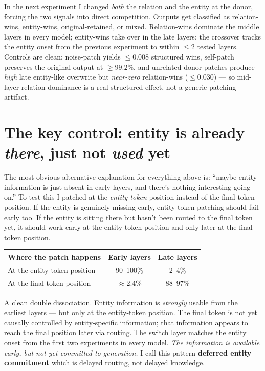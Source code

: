 \documentclass[10pt]{article}
\begin{document}
In the next experiment I changed \emph{both} the relation and the entity at the donor, forcing the two signals into direct competition. Outputs get classified as relation-wins, entity-wins, original-retained, or mixed. Relation-wins dominate the middle layers in every model; entity-wins take over in the late layers; the crossover tracks the entity onset from the previous experiment to within $\leq 2$ tested layers. Controls are clean: noise-patch yields $\leq 0.008$ structured wins, self-patch preserves the original output at $\geq 99.2\%$, and unrelated-donor patches produce \emph{high} late entity-like overwrite but \emph{near-zero} relation-wins ($\leq 0.030$) --- so mid-layer relation dominance is a real structured effect, not a generic patching artifact.

\section*{The key control: entity is already \emph{there}, just not \emph{used} yet}

The most obvious alternative explanation for everything above is: ``maybe entity information is just absent in early layers, and there's nothing interesting going on.'' To test this I patched at the \emph{entity-token} position instead of the final-token position. If the entity is genuinely missing early, entity-token patching should fail early too. If the entity is sitting there but hasn't been routed to the final token yet, it should work early at the entity-token position and only later at the final-token position.

\begin{center}\small
\begin{tabular}{lcc}
\toprule
Where the patch happens & Early layers & Late layers \\
\midrule
At the entity-token position & 90--100\% & 2--4\% \\
At the final-token position  & $\approx$2.4\% & 88--97\% \\
\bottomrule
\end{tabular}
\end{center}

A clean double dissociation. Entity information is \emph{strongly} usable from the earliest layers --- but only at the entity-token position. The final token is not yet causally controlled by entity-specific information; that information appears to reach the final position later via routing. The switch layer matches the entity onset from the first two experiments in every model. \emph{The information is available early, but not yet committed to generation.} I call this pattern \textbf{deferred entity commitment} which is delayed routing, not delayed knowledge.
\end{document}
